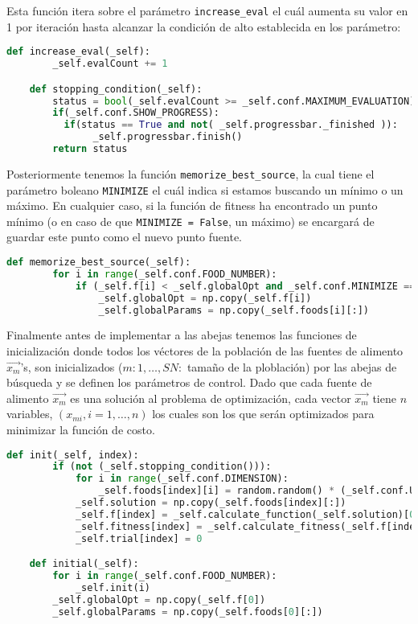 \documentclass{article}
\begin{document}
Esta función itera sobre el parámetro \texttt{increase\_eval} el cuál aumenta su valor en 1 por iteración hasta alcanzar la condición de alto establecida en los parámetro:
\begin{lstlisting}[language=Python]
    def increase_eval(_self):
        _self.evalCount += 1

    def stopping_condition(_self):
        status = bool(_self.evalCount >= _self.conf.MAXIMUM_EVALUATION)
        if(_self.conf.SHOW_PROGRESS):
          if(status == True and not( _self.progressbar._finished )):
               _self.progressbar.finish()
        return status
\end{lstlisting}


Posteriormente tenemos la función \texttt{memorize\_best\_source}, la cual tiene el parámetro boleano \texttt{MINIMIZE} el cuál indica si estamos buscando un mínimo o un máximo. En cualquier caso, si la función de fitness ha encontrado un punto mínimo (o en caso de que \texttt{MINIMIZE = False}, un máximo) se encargará de guardar este punto como el nuevo punto fuente.

\begin{lstlisting}[language=Python]
    def memorize_best_source(_self):
        for i in range(_self.conf.FOOD_NUMBER):
            if (_self.f[i] < _self.globalOpt and _self.conf.MINIMIZE == True) or (_self.f[i] >= _self.globalOpt and _self.conf.MINIMIZE == False):
                _self.globalOpt = np.copy(_self.f[i])
                _self.globalParams = np.copy(_self.foods[i][:])

\end{lstlisting}

Finalmente antes de implementar a las abejas tenemos las funciones de inicialización donde todos los v\'ectores de la poblaci\'on de las fuentes de alimento $\vec{x_m}$'s, son inicializados ($m:1,\dots ,SN:$ tamaño de la ploblaci\'on) por las abejas de búsqueda y se definen los parámetros de control. Dado que cada fuente de alimento $\vec{x_m}$ es una soluci\'on al problema de optimizaci\'on, cada vector $\vec{x_m}$ tiene $n$ variables, $(x_{mi}, i = 1,\dots,n)$ los cuales son los que serán optimizados para minimizar la funci\'on de costo. 

\begin{lstlisting}[language=Python]
    def init(_self, index):
        if (not (_self.stopping_condition())):
            for i in range(_self.conf.DIMENSION):
                _self.foods[index][i] = random.random() * (_self.conf.UPPER_BOUND - _self.conf.LOWER_BOUND) + _self.conf.LOWER_BOUND
            _self.solution = np.copy(_self.foods[index][:])
            _self.f[index] = _self.calculate_function(_self.solution)[0]
            _self.fitness[index] = _self.calculate_fitness(_self.f[index])
            _self.trial[index] = 0

    def initial(_self):
        for i in range(_self.conf.FOOD_NUMBER):
            _self.init(i)
        _self.globalOpt = np.copy(_self.f[0])
        _self.globalParams = np.copy(_self.foods[0][:])
\end{lstlisting}
\end{document}
